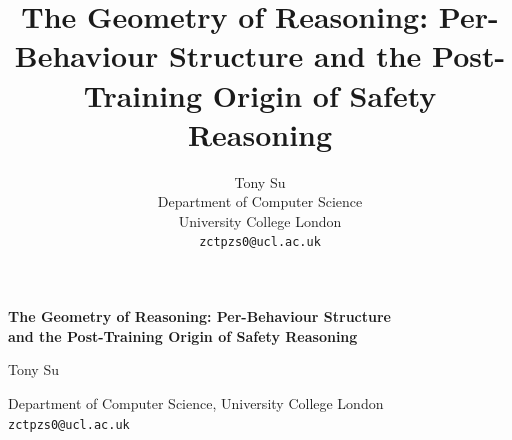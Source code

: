 \documentclass[10pt]{article}
\title{\bfseries The Geometry of Reasoning: Per-Behaviour Structure and the
Post-Training Origin of Safety Reasoning}
\author{Tony Su \\ Department of Computer Science \\ University College London \\
\texttt{zctpzs0@ucl.ac.uk}}
\date{}
\begin{document}
\begin{center}
{\LARGE\bfseries The Geometry of Reasoning: Per-Behaviour Structure\\[2pt]
and the Post-Training Origin of Safety Reasoning\par}
\vspace{1.1em}
{\large Tony Su\par}
\vspace{0.3em}
Department of Computer Science, University College London\\
\texttt{zctpzs0@ucl.ac.uk}
\end{center}
\let\thefootnote\relax{}
\vspace{0.8em}
\end{document}
